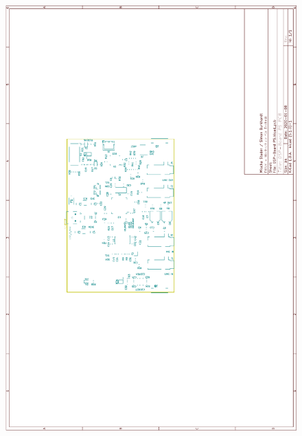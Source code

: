 \begin{appendix}
\begin{figure}[h]
	\centering
	\includegraphics[width=0.95\linewidth]{appendix/DSP-Board PCB V1-1 (3).pdf}
\end{figure}


\end{appendix}

